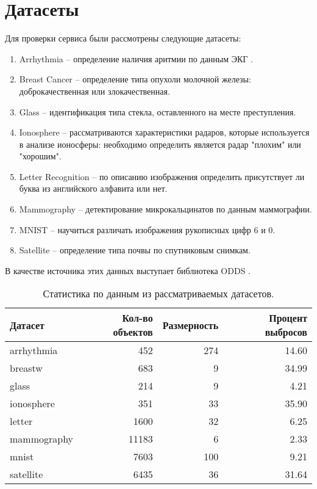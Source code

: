 \clearpage



\section{Датасеты} \label{sec:ch2/sec5}



\noindent Для проверки сервиса были рассмотрены следующие датасеты:
\begin{enumerate}
  \item Arrhythmia -- определение наличия аритмии по данным ЭКГ \cite{guvenir}.
  \item Breast Cancer -- определение типа опухоли молочной железы: доброкачественная или злокачественная.
  \item Glass -- идентификация типа стекла, оставленного на месте преступления.
  \item Ionosphere -- рассматриваются характеристики радаров, которые используется в анализе ионосферы: необходимо определить является радар "плохим" или "хорошим".
  \item Letter Recognition -- по описанию изображения определить присутствует ли буква из английского алфавита или нет.
  \item Mammography -- детектирование микрокальцинатов по данным маммографии.
  \item MNIST -- научиться различать изображения рукописных цифр 6 и 0.
  \item Satellite -- определение типа почвы по спутниковым снимкам.
\end{enumerate}
В качестве источника этих данных выступает библиотека ODDS \cite{odds}.

\begin{table} [htbp]
	\centering
	\caption{Статистика по данным из рассматриваемых датасетов.}\label{tab:stats}%
	\begin{tabular}{lrrr}
		\toprule
		     Датасет & Кол-во объектов & Размерность &  Процент выбросов \\
		\midrule
		  arrhythmia &      452 &         274 &      14.60 \\
		     breastw &      683 &           9 &      34.99 \\
		       glass &      214 &           9 &       4.21 \\
		  ionosphere &      351 &          33 &      35.90 \\
		      letter &     1600 &          32 &       6.25 \\
		 mammography &    11183 &           6 &       2.33 \\
		       mnist &     7603 &         100 &       9.21 \\
		   satellite &     6435 &          36 &      31.64 \\
		\bottomrule
		\hline
	\end{tabular}
\end{table}

